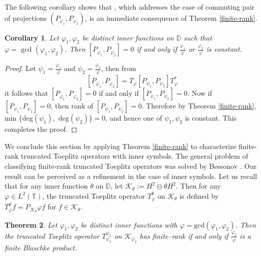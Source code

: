 \documentclass[12pt, a4 paper]{amsart}
\newcommand{\clk}{\mathcal{K}}
\newcommand{\D}{\mathbb{D}}
\newcommand{\T}{\mathbb{T}}
\theoremstyle{definition}
\theoremstyle{plain}
\newtheorem{thm}{Theorem}[section]
\newtheorem{cor}[thm]{Corollary}
\theoremstyle{definition}
\numberwithin{equation}{section}
\let\phi=\varphi
\begin{document}
The following corollary shows that \cite[Theorem 2.2]{DPS}, which addresses the case of commuting pair of projections $(P_{\phi_1},P_{\phi_2})$, is an immediate consequence of Theorem \ref{finite-rank}.
\begin{cor}
Let $\phi_1, \phi_2$ be distinct inner functions on $\D$ such that $\phi=\text{ gcd }(\phi_1,\phi_2)$. Then $[P_{\phi_1},P_{\phi_2}]=0$ if and only if $\frac{\phi_1}{\phi}$ or $\frac{\phi_2}{\phi}$ is constant.
\end{cor}
\begin{proof}
Let $\psi_1=\frac{\phi_1}{\phi}$ and $\psi_2=\frac{\phi_2}{\phi}$, then from $$[P_{\phi_1},P_{\phi_2}]=T_{\phi}[P_{\psi_1}, P_{\psi_2}]  T_{\phi}^*$$ it follows that $[P_{\phi_1},P_{\phi_2}]=0$ if and only if $[P_{\psi_1},P_{\psi_2}]=0$. Now if $[P_{\psi_1},P_{\psi_2}]=0$, then rank of $[P_{\psi_1},P_{\psi_2}]=0$. Therefore by Theorem \ref{finite-rank}, min $\{\text{deg}(\psi_1),\text{ deg}(\psi_2)\}=0$, and hence one of $\psi_1,\psi_2$ is constant. This completes the proof.
\end{proof}
We conclude this section by applying Theorem \ref{finite-rank} to characterize finite-rank truncated Toeplitz operators with inner symbols. The general problem of classifying finite-rank truncated Toeplitz operators was solved by Bessonov \cite{RV}. Our result can be perceived as a refinement in the case of inner symbols. Let us recall that for any inner function $\theta$ on $\D$, let $\clk_{\theta}:= H^2 \ominus \theta H^2$. Then for any $\phi \in L^2(\T)$, the truncated Toeplitz operator $T_{\phi}^{\theta}$ on $\clk_{\theta}$ is defined by $T_{\phi}^{\theta}f = P_{\clk_{\theta}} \phi f$ for $f \in \clk_{\theta}$.
\begin{thm}\label{tto}
Let $\phi_1,\phi_2$ be distinct inner functions with $\phi = \mbox{gcd}(\phi_1, \phi_2)$. Then the truncated Toeplitz operator $T_{\phi_1}^{\phi_2}$ on $\clk_{\phi_2}$ has finite--rank if and only if $\tfrac{\phi_2}{\phi}$ is a finite Blaschke product.
\end{thm}
\end{document}
